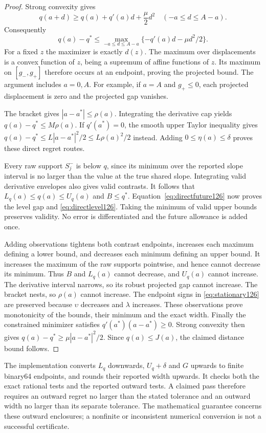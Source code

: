 \begin{proof}
Strong convexity gives
\[
 q(a+d)\ge q(a)+q'(a)d+\frac\mu2d^2
 \quad(-a\le d\le A-a).
\]
Consequently
\[
 q(a)-q^*\le
 \max_{-a\le d\le A-a}
          \{-q'(a)d-\mu d^2/2\}.
\]
For a fixed $z$ the maximizer is exactly $d(z)$.  The maximum over
displacements is a convex function of $z$, being a supremum of
affine functions of $z$.  Its maximum on $[g_-,g_+]$ therefore
occurs at an endpoint, proving the projected bound.  The argument
includes $a=0,A$.  For example, if $a=A$ and $g_+\le0$, each
projected displacement is zero and the projected gap vanishes.

The bracket gives $|a-a^*|\le\rho(a)$.  Integrating the derivative
cap yields $q(a)-q^*\le M\rho(a)$.  If $q'(a^*)=0$, the smooth
upper Taylor inequality gives
$q(a)-q^*\le L|a-a^*|^2/2\le L\rho(a)^2/2$ instead.
Adding $0\le\eta(a)\le\delta$ proves these direct regret routes.

Every raw support $S_j^-$ is below $q$, since its minimum over the
reported slope interval is no larger than the value at the true
shared slope.  Integrating valid derivative envelopes also gives
valid contrasts.  It follows that
$L_q(a)\le q(a)\le U_q(a)$ and $B\le q^*$.
Equation~\eqref{eq:directfuture126} now proves the level gap and
\eqref{eq:directlevel126}.  Taking the minimum of valid upper bounds
preserves validity.  No error is differentiated and the future
allowance is added once.

Adding observations tightens both contrast endpoints, increases each
maximum defining a lower bound, and decreases each minimum defining
an upper bound.  It increases the maximum of the raw supports
pointwise, and hence cannot decrease its minimum.  Thus $B$ and
$L_q(a)$ cannot decrease, and $U_q(a)$ cannot increase.  The derivative
interval narrows, so its robust projected gap cannot increase.
The bracket nests, so $\rho(a)$ cannot increase.
The endpoint signs in \eqref{eq:stationary126} are preserved because
$\upsilon$ decreases and $\lambda$ increases.  These observations
prove monotonicity of the bounds, their minimum and the exact width.
Finally the constrained minimizer satisfies
$q'(a^*)(a-a^*)\ge0$.  Strong convexity then gives
$q(a)-q^*\ge\mu|a-a^*|^2/2$.  Since $q(a)\le J(a)$, the
claimed distance bound follows.
\end{proof}

The implementation converts $L_q$ downwards, $U_q+\delta$ and $G$
upwards to finite binary64 endpoints, and rounds their reported width
upwards.  It checks both the exact rational tests and the reported
outward tests.  A claimed pass therefore requires an outward regret
no larger than the stated tolerance and an outward width no larger
than its separate tolerance.  The mathematical guarantee concerns
these outward enclosures; a nonfinite or inconsistent numerical
conversion is not a successful certificate.

